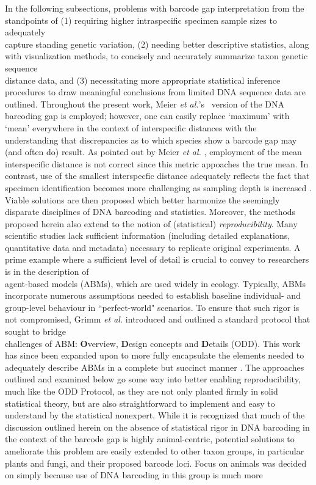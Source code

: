 In the following subsections, problems with barcode gap interpretation from the \\ standpoints of (1) requiring higher intraspecific specimen sample sizes to adequately \\ capture standing genetic variation, (2) needing better descriptive statistics, along with visualization methods, to concisely and accurately summarize taxon genetic sequence \\ distance data, and (3) necessitating more appropriate statistical inference procedures to draw meaningful conclusions from limited DNA sequence data are outlined. Throughout the present work, Meier \textit{et al.}'s~\cite{meier2008use} version of the DNA barcoding gap is employed; however, one can easily replace `maximum' with `mean' everywhere in the context of interspecific distances with the understanding that discrepancies as to which species show a barcode gap may (and often do) result. As pointed out by Meier \textit{et al.} \cite{meier2008ue}, employment of the mean interspecific distance is not correct since this metric appoaches the true mean. In contrast, use of the smallest interspecfic distance adequately reflects the fact that specimen identification becomes more challenging as sampling depth is increased \cite{meier2008use}. Viable solutions are then proposed which better harmonize the seemingly disparate disciplines of DNA barcoding and statistics. Moreover, the methods proposed herein also extend to the notion of (statistical) \textit{reproducibility}. Many scientific studies lack sufficient information (including detailed explanations, quantitative data and metadata) necessary to replicate original experiments. A prime example where a sufficient level of detail is crucial to convey to researchers is in the description of \\ agent-based models (ABMs), which are used widely in ecology. Typically, ABMs \\ incorporate numerous assumptions needed to establish baseline individual- and group-level behaviour in ``perfect-world" scenarios. To ensure that such rigor is not compromised, Grimm \textit{et al.} \cite{grimm2006standard} introduced and outlined a standard protocol that sought to bridge \\ challenges of ABM: \textbf{O}verview, \textbf{D}esign concepts and \textbf{D}etails (ODD). This work has since been expanded upon to more fully encapsulate the elements needed to adequately describe ABMs in a complete but succinct manner \cite{grimm2010odd}. The approaches outlined and examined below go some way into better enabling reproducibility, much like the ODD Protocol, as they are not only planted firmly in solid statistical theory, but are also straightforward to implement and easy to understand by the statistical nonexpert. While it is recognized that much of the discussion outlined herein on the absence of statistical rigor in DNA barcoding in the context of the barcode gap is highly animal-centric, potential solutions to ameliorate this problem are easily extended to other taxon groups, in particular plants and fungi, and their proposed barcode loci. Focus on animals was decided on simply because use of DNA barcoding in this group is much more 